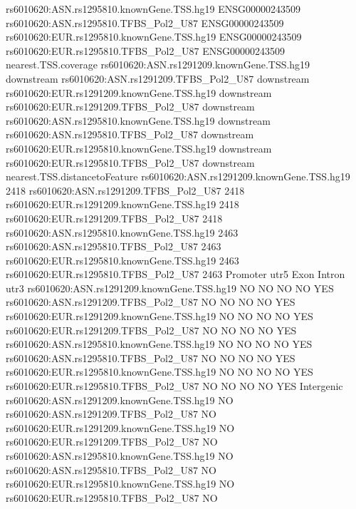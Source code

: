\documentclass[a4paper]{article}
\begin{document}
\begin{Schunk}
\begin{Soutput}
rs6010620:ASN.rs1295810.knownGene.TSS.hg19     ENSG00000243509
rs6010620:ASN.rs1295810.TFBS_Pol2_U87          ENSG00000243509
rs6010620:EUR.rs1295810.knownGene.TSS.hg19     ENSG00000243509
rs6010620:EUR.rs1295810.TFBS_Pol2_U87          ENSG00000243509
                                           nearest.TSS.coverage
rs6010620:ASN.rs1291209.knownGene.TSS.hg19           downstream
rs6010620:ASN.rs1291209.TFBS_Pol2_U87                downstream
rs6010620:EUR.rs1291209.knownGene.TSS.hg19           downstream
rs6010620:EUR.rs1291209.TFBS_Pol2_U87                downstream
rs6010620:ASN.rs1295810.knownGene.TSS.hg19           downstream
rs6010620:ASN.rs1295810.TFBS_Pol2_U87                downstream
rs6010620:EUR.rs1295810.knownGene.TSS.hg19           downstream
rs6010620:EUR.rs1295810.TFBS_Pol2_U87                downstream
                                           nearest.TSS.distancetoFeature
rs6010620:ASN.rs1291209.knownGene.TSS.hg19                          2418
rs6010620:ASN.rs1291209.TFBS_Pol2_U87                               2418
rs6010620:EUR.rs1291209.knownGene.TSS.hg19                          2418
rs6010620:EUR.rs1291209.TFBS_Pol2_U87                               2418
rs6010620:ASN.rs1295810.knownGene.TSS.hg19                          2463
rs6010620:ASN.rs1295810.TFBS_Pol2_U87                               2463
rs6010620:EUR.rs1295810.knownGene.TSS.hg19                          2463
rs6010620:EUR.rs1295810.TFBS_Pol2_U87                               2463
                                           Promoter utr5 Exon Intron utr3
rs6010620:ASN.rs1291209.knownGene.TSS.hg19       NO   NO   NO     NO  YES
rs6010620:ASN.rs1291209.TFBS_Pol2_U87            NO   NO   NO     NO  YES
rs6010620:EUR.rs1291209.knownGene.TSS.hg19       NO   NO   NO     NO  YES
rs6010620:EUR.rs1291209.TFBS_Pol2_U87            NO   NO   NO     NO  YES
rs6010620:ASN.rs1295810.knownGene.TSS.hg19       NO   NO   NO     NO  YES
rs6010620:ASN.rs1295810.TFBS_Pol2_U87            NO   NO   NO     NO  YES
rs6010620:EUR.rs1295810.knownGene.TSS.hg19       NO   NO   NO     NO  YES
rs6010620:EUR.rs1295810.TFBS_Pol2_U87            NO   NO   NO     NO  YES
                                           Intergenic
rs6010620:ASN.rs1291209.knownGene.TSS.hg19         NO
rs6010620:ASN.rs1291209.TFBS_Pol2_U87              NO
rs6010620:EUR.rs1291209.knownGene.TSS.hg19         NO
rs6010620:EUR.rs1291209.TFBS_Pol2_U87              NO
rs6010620:ASN.rs1295810.knownGene.TSS.hg19         NO
rs6010620:ASN.rs1295810.TFBS_Pol2_U87              NO
rs6010620:EUR.rs1295810.knownGene.TSS.hg19         NO
rs6010620:EUR.rs1295810.TFBS_Pol2_U87              NO
\end{Soutput}
\end{Schunk}
\end{document}
